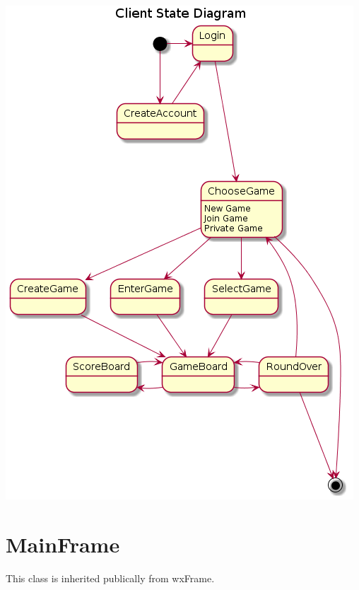 \documentclass[]{scrartcl}
\begin{document}
 \centerline{\includegraphics{Client State Diagram.png}}
 \noindent{}

 \section{MainFrame}
 	This class is inherited publically from wxFrame.
\end{document}
